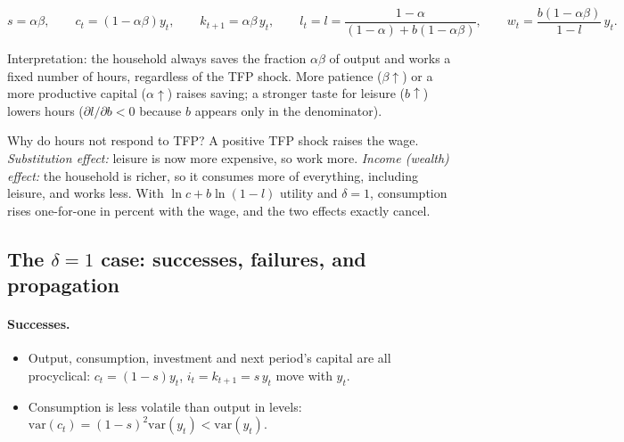 \begin{keybox}[title={$\delta=1$ closed-form solution}]
\[
s=\alpha\beta,\qquad c_t=(1-\alpha\beta)y_t,\qquad k_{t+1}=\alpha\beta\,y_t,\qquad
l_t=l=\frac{1-\alpha}{(1-\alpha)+b(1-\alpha\beta)},\qquad w_t=\frac{b(1-\alpha\beta)}{1-l}\,y_t .
\]
\end{keybox}
Interpretation: the household always saves the fraction $\alpha\beta$ of output and works a fixed number of hours, regardless of the TFP shock. More patience ($\beta\uparrow$) or a more productive capital ($\alpha\uparrow$) raises saving; a stronger taste for leisure ($b\uparrow$) lowers hours ($\partial l/\partial b<0$ because $b$ appears only in the denominator).

\begin{tipbox}
Why do hours not respond to TFP? A positive TFP shock raises the wage. \emph{Substitution effect:} leisure is now more expensive, so work more. \emph{Income (wealth) effect:} the household is richer, so it consumes more of everything, including leisure, and works less. With $\ln c+b\ln(1-l)$ utility and $\delta=1$, consumption rises one-for-one in percent with the wage, and the two effects exactly cancel.
\end{tipbox}

\subsection{The $\delta=1$ case: successes, failures, and propagation }

\paragraph{Successes.}
\begin{itemize}
  \item Output, consumption, investment and next period's capital are all procyclical: $c_t=(1-s)y_t$, $i_t=k_{t+1}=s\,y_t$ move with $y_t$.
  \item Consumption is less volatile than output in levels: $\mathrm{var}(c_t)=(1-s)^2\mathrm{var}(y_t)<\mathrm{var}(y_t)$.
\end{itemize}

